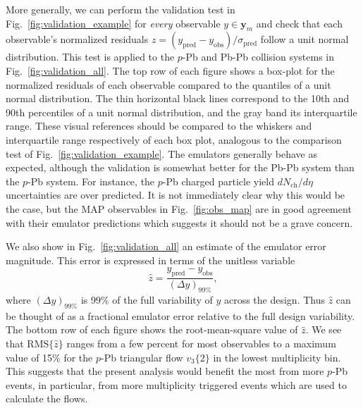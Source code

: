 \documentclass[aps,prc,reprint,amsmath,nofootinbib]{revtex4-1}
\newcommand{\nch}{N_\text{ch}}
\newcommand{\y}{\mathbf y}
\begin{document}
More generally, we can perform the validation test in Fig.~\ref{fig:validation_example} for \emph{every} observable $y \in \y_m$ and check that each observable's normalized residuals ${z=(y_\text{pred} - y_\text{obs})/\sigma_\text{pred}}$ follow a unit normal distribution.
This test is applied to the $p$-Pb and Pb-Pb collision systems in Fig.~\ref{fig:validation_all}.
The top row of each figure shows a box-plot for the normalized residuals of each observable compared to the quantiles of a unit normal distribution.
The thin horizontal black lines correspond to the 10th and 90th percentiles of a unit normal distribution, and the gray band its interquartile range.
These visual references should be compared to the whiskers and interquartile range respectively of each box plot, analogous to the comparison test of Fig.~\ref{fig:validation_example}.
The emulators generally behave as expected, although the validation is somewhat better for the Pb-Pb system than the $p$-Pb system.
For instance, the $p$-Pb charged particle yield $d\nch/d\eta$ uncertainties are over predicted.
It is not immediately clear why this would be the case, but the MAP observables in Fig.~\ref{fig:obs_map} are in good agreement with their emulator predictions which suggests it should not be a grave concern.

We also show in Fig.~\ref{fig:validation_all} an estimate of the emulator error magnitude.
This error is expressed in terms of the unitless variable
\begin{equation}
  \hat{z} = \frac{y_\text{pred} - y_\text{obs}}{(\Delta y)_{99\%}},
\end{equation}
where $(\Delta y)_{99\%}$ is 99\% of the full variability of $y$ across the design.
Thus $\hat{z}$ can be thought of as a fractional emulator error relative to the full design variability.
The bottom row of each figure shows the root-mean-square value of $\hat{z}$.
We see that $\text{RMS}\{\hat{z}\}$ ranges from a few percent for most observables to a maximum value of 15\% for the $p$-Pb triangular flow $v_3\{2\}$ in the lowest multiplicity bin.
This suggests that the present analysis would benefit the most from more $p$-Pb events, in particular, from more multiplicity triggered events which are used to calculate the flows.
\end{document}
